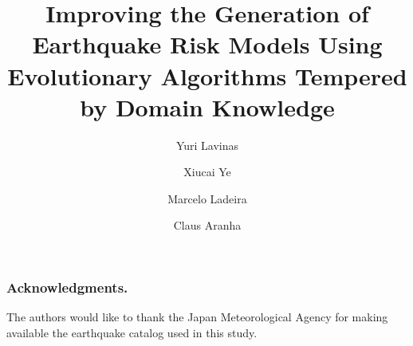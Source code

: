 \documentclass{llncs}
\begin{document}
\title{Improving the Generation of Earthquake Risk Models Using
  Evolutionary Algorithms Tempered by Domain Knowledge}

\author{
  Yuri Lavinas \and 
  Xiucai Ye \and 
  Marcelo Ladeira \and 
  Claus Aranha
}


\maketitle

\begin{abstract}

\end{abstract}


 






\subsubsection*{Acknowledgments.} 
The authors would like to thank the Japan Meteorological Agency for
making available the earthquake catalog used in this study.



\end{document}
